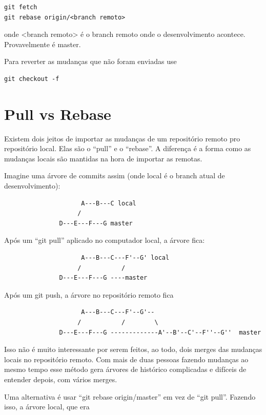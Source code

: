 \documentclass[12pt,brazil]{book}
\begin{document}
\begin{verbatim}
git fetch
git rebase origin/<branch remoto>
\end{verbatim}

onde <branch remoto> é o branch remoto onde o desenvolvimento
acontece. Provavelmente é master.

Para reverter as mudanças que não foram enviadas use

\begin{verbatim}
git checkout -f
\end{verbatim}


\section{Pull vs Rebase}

Existem dois jeitos de importar as mudanças de um repositório remoto
pro repositório local. Elas são o ``pull'' e o ``rebase''. A diferença
é a forma como as mudanças locais são mantidas na hora de importar as
remotas.

Imagine uma árvore de commits assim (onde local é o branch atual de desenvolvimento):

\begin{verbatim}
                     A---B---C local
                    /
               D---E---F---G master
\end{verbatim}

Após um ``git pull'' aplicado no computador local, a árvore fica:

\begin{verbatim}
                     A---B---C---F'--G' local
                    /           /
               D---E---F---G ----master
\end{verbatim}

Após um git push, a árvore no repositório remoto fica

\begin{verbatim}
                     A---B---C---F'--G'-- 
                    /           /        \
               D---E---F---G -------------A'--B'--C'--F''--G''  master
\end{verbatim}

Isso não é muito interessante por serem feitos, ao todo, dois merges
das mudanças locais no repositório remoto. Com mais de duas pessoas
fazendo mudanças ao mesmo tempo esse método gera árvores de histórico
complicadas e difíceis de entender depois, com vários merges.

Uma alternativa é usar ``git rebase origin/master'' em vez de ``git
pull''. Fazendo isso, a árvore local, que era
\end{document}
